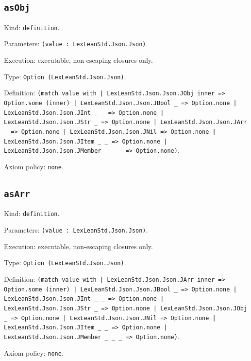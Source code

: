 \documentclass[11pt]{article}
\begin{document}
\subsection*{\texttt{asObj}}
\noindent Kind: \texttt{definition}.\par
\noindent Parameters: \texttt{(value : LexLeanStd.Json.Json)}.\par
\noindent Execution: executable, non-escaping closures only.\par
\noindent Type: \texttt{Option (LexLeanStd.Json.Json)}.\par
\noindent Definition: \texttt{(match value with | LexLeanStd.Json.Json.JObj inner => Option.some (inner) | LexLeanStd.Json.Json.JBool \_ => Option.none | LexLeanStd.Json.Json.JInt \_ \_ => Option.none | LexLeanStd.Json.Json.JStr \_ => Option.none | LexLeanStd.Json.Json.JArr \_ => Option.none | LexLeanStd.Json.Json.JNil => Option.none | LexLeanStd.Json.Json.JItem \_ \_ => Option.none | LexLeanStd.Json.Json.JMember \_ \_ \_ => Option.none)}.\par
\noindent Axiom policy: \texttt{none}.\par
\subsection*{\texttt{asArr}}
\noindent Kind: \texttt{definition}.\par
\noindent Parameters: \texttt{(value : LexLeanStd.Json.Json)}.\par
\noindent Execution: executable, non-escaping closures only.\par
\noindent Type: \texttt{Option (LexLeanStd.Json.Json)}.\par
\noindent Definition: \texttt{(match value with | LexLeanStd.Json.Json.JArr inner => Option.some (inner) | LexLeanStd.Json.Json.JBool \_ => Option.none | LexLeanStd.Json.Json.JInt \_ \_ => Option.none | LexLeanStd.Json.Json.JStr \_ => Option.none | LexLeanStd.Json.Json.JObj \_ => Option.none | LexLeanStd.Json.Json.JNil => Option.none | LexLeanStd.Json.Json.JItem \_ \_ => Option.none | LexLeanStd.Json.Json.JMember \_ \_ \_ => Option.none)}.\par
\noindent Axiom policy: \texttt{none}.\par
\end{document}
